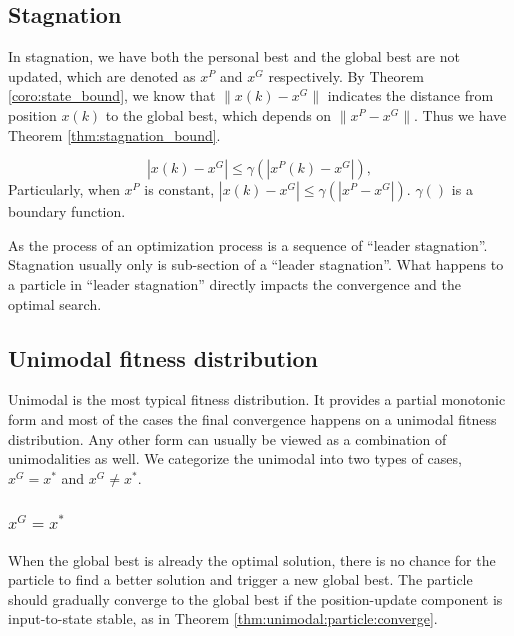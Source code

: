 \subsection{Stagnation}

In stagnation, we have both the personal best and the global best are not updated, which are denoted as $ x^{P} $ and $ x^{G} $ respectively.
By Theorem \ref{coro:state_bound}, we know that $ \lVert x(k) - x^{G} \rVert $ indicates the distance from position $ x(k) $ to the global best, which depends on  $ \lVert x^{P} - x^{G} \rVert $.
Thus we have Theorem \ref{thm:stagnation_bound}.

\begin{mythm}
\label{thm:stagnation_bound}
\begin{equation}
| x(k) - x^{G} | \leq \gamma ( | x^{P}(k) - x^{G} | ), 
\end{equation}
Particularly, when $ x^{P} $ is constant,
$  | x(k) - x^{G} | \leq \gamma ( | x^{P} - x^{G} | ). $
$ \gamma () $ is a boundary function.
\end{mythm}

As the process of an optimization process is a sequence of ``leader stagnation''.
Stagnation usually only is sub-section of a ``leader stagnation''.
What happens to a particle in ``leader stagnation'' directly impacts the convergence and the optimal search.

\subsection{Unimodal fitness distribution}

Unimodal is the most typical fitness distribution.
It provides a partial monotonic form and most of the cases the final convergence happens on a unimodal fitness distribution.
Any other form can usually be viewed as a combination of unimodalities as well.
We categorize the unimodal into two types of cases, $ x^{G} = x^{*} $ and $ x^{G} \not = x^{*} $.

\subsubsection{$ x^{G} = x^{*} $}

When the global best is already the optimal solution, there is no chance for the particle to find a better solution and trigger a new global best.
The particle should gradually converge to the global best if the position-update component is input-to-state stable, as in Theorem \ref{thm:unimodal:particle:converge}.

